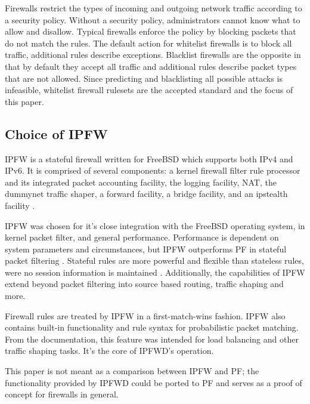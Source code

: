 \documentclass[journal]{IEEEtran}
\begin{document}
    Firewalls restrict the types of incoming and outgoing network traffic
    according to a security policy. Without a security policy, administrators
    cannot know what to allow and disallow. Typical firewalls enforce the
    policy by blocking packets that do not match the rules. The default action
    for whitelist firewalls is to block all traffic, additional rules describe
    exceptions. Blacklist firewalls are the opposite in that by default they
    accept all traffic and additional rules describe packet types that are not
    allowed. Since predicting and blacklisting all possible attacks is
    infeasible, whitelist firewall rulesets are the accepted standard and the
    focus of this paper.

  \subsection{Choice of IPFW}

    IPFW is a stateful firewall written for FreeBSD which supports both IPv4
    and IPv6. It is comprised of several components: a kernel firewall filter
    rule processor and its integrated packet accounting facility, the logging
    facility, NAT, the dummynet traffic shaper, a forward facility, a bridge
    facility, and an ipstealth facility \cite{freebsdhandbook}.

    IPFW was chosen for it's close integration with the FreeBSD operating
    system, in kernel packet filter, and general performance. Performance is
    dependent on system parameters and circumstances, but IPFW outperforms PF
    in stateful packet filtering \cite{ipfwvspf}. Stateful rules are more
    powerful and flexible than stateless rules, were no session information is
    maintained \cite{networksecurity}.  Additionally, the capabilities of IPFW
    extend beyond packet filtering into source based routing, traffic shaping
    and more. 

    Firewall rules are treated by IPFW in a first-match-wins fashion. IPFW also
    contains built-in functionality and rule syntax for probabilistic packet
    matching. From the documentation, this feature was intended for load
    balancing and other traffic shaping tasks. It's the core of IPFWD's
    operation. 

    This paper is not meant as a comparison between IPFW and PF; the
    functionality provided by IPFWD could be ported to PF and serves as a proof
    of concept for firewalls in general.
\end{document}
